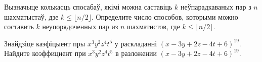 \begin{problemList}
\bigskip

\problemItemSimple
{Вызначыце колькасць спосабаў, якімі можна саставіць $k$ неўпарадкаваных
пар з $n$ шахматыстаў, дзе $k \le \lfloor n/2\rfloor$.}
{Определите число способов, которыми можно составить $k$ неупорядоченных
пар из $n$ шахматистов, где $k \le \lfloor n/2\rfloor$.}

\bigskip

\problemItemSimple
{Знайдзіце каэфіцыент пры $x^3y^2z^4t^5$ у раскладанні $(x - 3y + 2z - 4t + 6)^{19}$.}
{Найдите коэффициент при $x^3y^2z^4t^5$ в разложении $(x - 3y + 2z - 4t + 6)^{19}$.}

\end{problemList}


